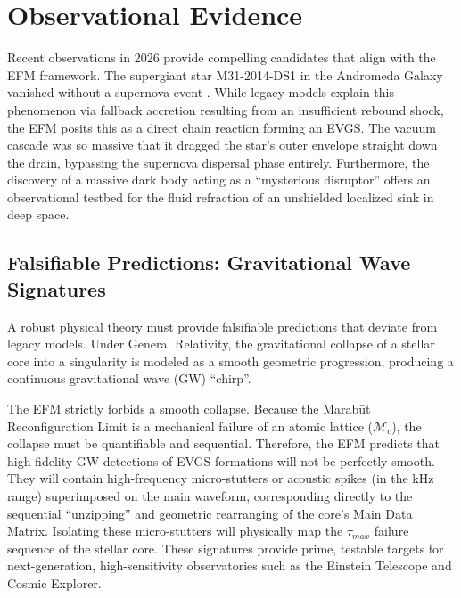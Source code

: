 \documentclass[11pt, a4paper]{article}
\begin{document}
\section{Observational Evidence}
  Recent observations in 2026 provide compelling candidates that align with the EFM framework. The supergiant star M31-2014-DS1 in the Andromeda Galaxy vanished without a supernova event \cite{columbia2026}. While legacy models explain this phenomenon via fallback accretion resulting from an insufficient rebound shock, the EFM posits this as a direct chain reaction forming an EVGS. The vacuum cascade was so massive that it dragged the star's outer envelope straight down the drain, bypassing the supernova dispersal phase entirely. Furthermore, the discovery of a massive dark body acting as a ``mysterious disruptor'' \cite{apj2026} offers an observational testbed for the fluid refraction of an unshielded localized sink in deep space.

  \subsection{Falsifiable Predictions: Gravitational Wave Signatures}
  A robust physical theory must provide falsifiable predictions that deviate from legacy models. Under General Relativity, the gravitational collapse of a stellar core into a singularity is modeled as a smooth geometric progression, producing a continuous gravitational wave (GW) ``chirp''. 
  
  The EFM strictly forbids a smooth collapse. Because the Marab\={u}t Reconfiguration Limit is a mechanical failure of an atomic lattice ($\mathcal{M}_c$), the collapse must be quantifiable and sequential. Therefore, the EFM predicts that high-fidelity GW detections of EVGS formations will not be perfectly smooth. They will contain high-frequency micro-stutters or acoustic spikes (in the kHz range) superimposed on the main waveform, corresponding directly to the sequential ``unzipping'' and geometric rearranging of the core's Main Data Matrix. Isolating these micro-stutters will physically map the $\tau_{max}$ failure sequence of the stellar core. These signatures provide prime, testable targets for next-generation, high-sensitivity observatories such as the Einstein Telescope and Cosmic Explorer.
  
\end{document}
